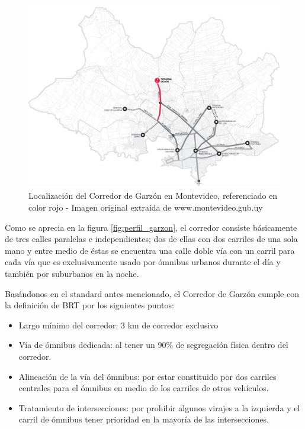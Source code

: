 \begin{figure}[H]
	\centering
	\includegraphics[width=0.99\linewidth]{Figures/Mapa_Garzon_0}
	\caption[Localización del Corredor de Garzón en Montevideo]{Localización del Corredor de Garzón en Montevideo, referenciado en color rojo - Imagen original extraída de www.montevideo.gub.uy		
	}
	\label{fig:Grafica de costos de otros medios de transporte}
\end{figure}

Como se aprecia en la figura \ref{fig:perfil_garzon}, el corredor consiste básicamente de tres calles paralelas e independientes; dos de ellas con dos carriles de una sola mano y entre medio de éstas se encuentra una calle doble vía con un carril para cada vía que es exclusivamente usado por ómnibus urbanos durante el día y también por suburbanos en la noche.


Basándonos en el standard antes mencionado, el Corredor de Garzón cumple con la definición de BRT por los siguientes puntos:
\begin{itemize}
	\item Largo mínimo del corredor: 3 km de corredor exclusivo 
	\item Vía de ómnibus dedicada: al tener un 90\% de segregación física dentro del corredor.
	\item Alineación de la vía del ómnibus: por estar constituido por dos carriles centrales para el ómnibus en medio de los carriles de otros vehículos.
	\item Tratamiento de intersecciones: por prohibir algunos virajes a la izquierda y el carril de ómnibus tener prioridad en la mayoría de las intersecciones.
\end{itemize}


